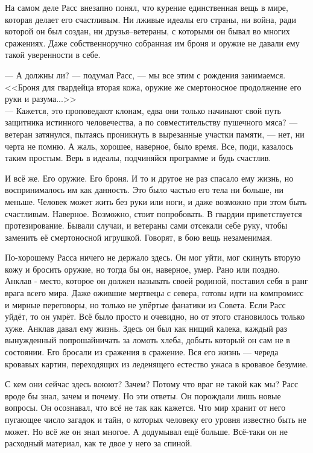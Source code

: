 На самом деле Расс внезапно понял, что курение единственная вещь в мире, которая 
делает его счастливым. Ни лживые идеалы его страны,  ни война, ради которой он 
был создан, ни друзья--ветераны, с которыми он бывал во многих сражениях. Даже 
собственноручно собранная им броня и оружие не давали ему такой уверенности в 
себе.

\noindent --- А должны ли? --- подумал Расс, --- мы все этим с рождения 
занимаемся. <<Броня для гвардейца вторая кожа, оружие же смертоносное 
продолжение его руки и разума...>> \\
--- Кажется, это проповедают клонам, едва они 
только начинают свой путь защитника истинного человечества, а по 
совместительству пушечного мяса? --- ветеран затянулся, пытаясь проникнуть в 
вырезанные участки памяти, --- нет, ни черта не помню. А жаль, хорошее, 
наверное, было время. Все, поди, казалось таким простым. Верь в идеалы, 
подчиняйся программе и будь счастлив.

И всё же. Его оружие. Его броня. И то и другое не раз спасало ему жизнь, но 
воспринималось им как данность. Это было частью его тела ни больше, ни меньше. 
Человек может жить без руки или ноги, и даже возможно при этом быть счастливым. 
Наверное. Возможно, стоит попробовать. В гвардии приветствуется протезирование. 
Бывали случаи, и ветераны сами отсекали себе руку, чтобы заменить её 
смертоносной игрушкой. Говорят, в бою вещь незаменимая.

По-хорошему Расса ничего не держало здесь. Он мог уйти, мог скинуть вторую кожу 
и бросить оружие, но тогда бы он, наверное, умер. Рано или поздно. Анклав - 
место, которое он должен называть своей родиной, поставил себя в ранг врага 
всего мира. Даже ожившие мертвецы с севера, готовы идти на компромисс и мирные 
переговоры, но только не упёртые фанатики из Совета. Если Расс уйдёт, то он 
умрёт. Всё было просто и очевидно, но от этого становилось только хуже. Анклав 
давал ему жизнь. Здесь он был как нищий калека, каждый раз вынужденный 
попрошайничать за ломоть хлеба, добыть который он сам не в состоянии. Его 
бросали из сражения в сражение. Вся его жизнь --- череда кровавых картин, 
переходящих из леденящего естество ужаса в кровавое безумие.

С кем они сейчас здесь воюют? Зачем? Потому что враг не такой как мы? Расс вроде 
бы знал, зачем и почему. Но эти ответы. Он порождали лишь новые вопросы. Он 
осознавал, что всё не так как кажется. Что мир хранит от него пугающее число 
загадок и тайн, о которых человеку его уровня известно быть не может. Но всё же 
он знал многое. А додумывал ещё больше. Всё-таки он не расходный материал, как 
те двое у него за спиной.


